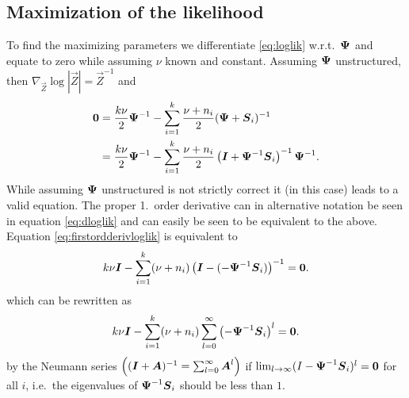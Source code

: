 \documentclass{article}\usepackage[]{graphicx}\usepackage[]{color}
\begin{document}
\subsection{Maximization of the likelihood}
To find the maximizing parameters we differentiate \eqref{eq:loglik} w.r.t.\ ${\boldsymbol{\Psi}}$ and equate to zero while assuming $\nu$ known and constant. Assuming ${\boldsymbol{\Psi}}$ unstructured, then $\nabla_{\vec{Z}} \log|\vec{Z}| = \vec{Z}^{-1}$ and
\begin{align}
  \boldsymbol{0}
  &= \frac{k\nu}{2} {\boldsymbol{\Psi}}^{-1}
    - \sum_{i=1}^k \frac{\nu + n_i}{2}
      ({\boldsymbol{\Psi}} + \boldsymbol{S}_i)^{-1}
  \label{eq:firstordderivloglik} \\
  &= \frac{k\nu}{2} {\boldsymbol{\Psi}}^{-1}
    - \sum_{i=1}^k \frac{\nu + n_i}{2}
      \left(\boldsymbol{I} + {\boldsymbol{\Psi}}^{-1}\boldsymbol{S}_i\right)^{-1}{\boldsymbol{\Psi}}^{-1}.
      \notag
\end{align}
While assuming ${\boldsymbol{\Psi}}$ unstructured is not strictly correct it (in this case) leads to a valid equation. The proper 1.\ order derivative can in alternative notation be seen in equation \eqref{eq:dloglik} and can easily be seen to be equivalent to the above.
Equation \eqref{eq:firstordderivloglik} is equivalent to
\begin{align*}
    k\nu \boldsymbol{I}
    - \sum_{i=1}^k (\nu + n_i)
      \left(\boldsymbol{I} - (-{\boldsymbol{\Psi}}^{-1}\boldsymbol{S}_i)\right)^{-1}
   = \boldsymbol{0}.
\end{align*}
which can be rewritten as
\begin{align*}
    k\nu \boldsymbol{I}
    - \sum_{i=1}^k      (\nu + n_i)
      \sum_{l=0}^\infty \left(-{\boldsymbol{\Psi}}^{-1}\boldsymbol{S}_i\right)^{l}
   = \boldsymbol{0}.
\end{align*}
by the Neumann series $\left(({\boldsymbol{I}} + \boldsymbol{A})^{-1} = \sum_{l = 0}^\infty \boldsymbol{A}^l\right)$ if $\lim_{l \to \infty} (I - {\boldsymbol{\Psi}}^{-1}\boldsymbol{S}_i)^l = \boldsymbol{0}$ for all $i$, i.e.\ the eigenvalues of ${\boldsymbol{\Psi}}^{-1}\boldsymbol{S}_i$ should be less than $1$.
\end{document}
